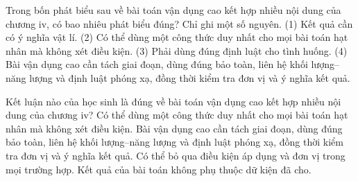 \begin{ex}
Trong bốn phát biểu sau về bài toán vận dụng cao kết hợp nhiều nội dung của chương iv, có bao nhiêu phát biểu đúng? Chỉ ghi một số nguyên. (1) Kết quả cần có ý nghĩa vật lí. (2) Có thể dùng một công thức duy nhất cho mọi bài toán hạt nhân mà không xét điều kiện. (3) Phải dùng đúng định luật cho tình huống. (4) Bài vận dụng cao cần tách giai đoạn, dùng đúng bảo toàn, liên hệ khối lượng–năng lượng và định luật phóng xạ, đồng thời kiểm tra đơn vị và ý nghĩa kết quả.
\end{ex}

\begin{ex}
Kết luận nào của học sinh là đúng về bài toán vận dụng cao kết hợp nhiều nội dung của chương iv?
\choice
{Có thể dùng một công thức duy nhất cho mọi bài toán hạt nhân mà không xét điều kiện.}
{\True Bài vận dụng cao cần tách giai đoạn, dùng đúng bảo toàn, liên hệ khối lượng–năng lượng và định luật phóng xạ, đồng thời kiểm tra đơn vị và ý nghĩa kết quả.}
{Có thể bỏ qua điều kiện áp dụng và đơn vị trong mọi trường hợp.}
{Kết quả của bài toán không phụ thuộc dữ kiện đã cho.}
\end{ex}

